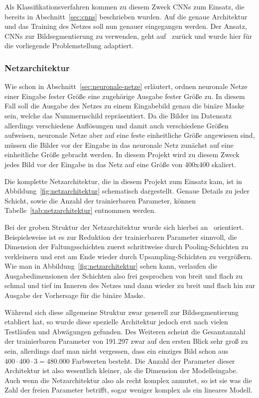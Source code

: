 Als Klassifikationsverfahren kommen zu diesem Zweck CNNs zum Einsatz,
die bereits in Abschnitt~\ref{sec:cnns} beschrieben wurden.
Auf die genaue Architektur und das Training des Netzes soll nun genauer
eingegangen werden.
Der Ansatz, CNNs zur Bildsegmentierung zu verwenden, geht
auf~\cite{image-segmentation} zur\"uck und wurde hier f\"ur die
vorliegende Problemstellung adaptiert.

\subsubsection{Netzarchitektur}

Wie schon in Abschnitt~\ref{sec:neuronale-netze} erl\"autert, ordnen
neuronale Netze einer Eingabe fester Gr\"o{\ss}e eine zugeh\"orige
Ausgabe fester Gr\"o{\ss}e zu.
In diesem Fall soll die Ausgabe des Netzes zu einem Eingabebild
genau die bin\"are Maske sein, welche das Nummernschild repr\"asentiert.
Da die Bilder im Datensatz allerdings verschiedene Aufl\"osungen
und damit auch verschiedene Gr\"o{\ss}en aufweisen, neuronale Netze
aber auf eine feste einheitliche Gr\"o{\ss}e angewiesen sind,
m\"ussen die Bilder vor der Eingabe in das neuronale Netz
zun\"achst auf eine einheitliche Gr\"o{\ss}e gebracht werden.
In diesem Projekt wird zu diesem Zweck jedes Bild vor der Eingabe
in das Netz auf eine Gr\"o{\ss}e von 400x400 skaliert.

Die komplette Netzarchitektur, die in diesem Projekt zum Einsatz kam,
ist in Abbildung~\ref{fig:netzarchitektur} schematisch dargestellt.
Genaue Details zu jeder Schicht, sowie die Anzahl der trainierbaren
Parameter, k\"onnen Tabelle~\ref{tab:netzarchitektur} entnommen werden.

Bei der groben Struktur der Netzarchitektur wurde sich hierbei
an~\cite{image-segmentation} orientiert. Beispielsweise ist es
zur Reduktion der trainierbaren Parameter sinnvoll, die Dimension der
Faltungsschichten zuerst schrittweise durch Pooling-Schichten zu
verkleinern und erst am
Ende wieder durch Upsampling-Schichten zu vergr\"o{\ss}ern.
Wie man in Abbildung~\ref{fig:netzarchitektur} sehen kann, verlaufen
die Ausgabedimensionen der Schichten also frei gesprochen von
\glqq breit und flach\grqq{} zu \glqq schmal und tief\grqq{} im Inneren
des Netzes und dann wieder zu \glqq breit und flach\grqq{} hin zur
Ausgabe der Vorhersage f\"ur die bin\"are Maske.

W\"ahrend sich diese allgemeine Struktur zwar generell zur Bildsegmentierung
etabliert hat, so wurde diese spezielle Architektur jedoch erst nach
vielen Testl\"aufen und Abw\"agungen gefunden. Des Weiteren scheint
die Gesamtanzahl der trainierbaren Parameter von 191.297 zwar auf den
ersten Blick sehr gro{\ss} zu sein, allerdings darf man nicht vergessen,
dass ein einziges Bild schon aus $400 \cdot 400 \cdot 3 = 480.000$
Farbwerten besteht. Die Anzahl der Parameter dieser Architektur ist also
wesentlich kleiner, als die Dimension der Modelleingabe.
Auch wenn die Netzarchitektur also als recht komplex anmutet, so ist sie
was die Zahl der freien Parameter betrifft, sogar weniger komplex als ein
lineares Modell.


